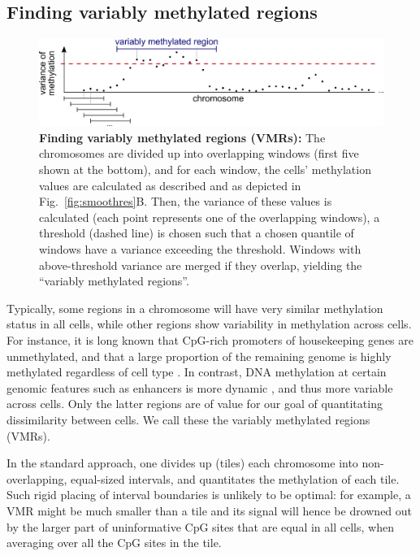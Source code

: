 \documentclass[twocolumn,10pt]{article}
\begin{document}
\subsection{Finding variably methylated regions}

\begin{figure}
    \includegraphics[width=\columnwidth]{figures/Fig_sliding.png}
    \caption{\small \textbf{Finding variably methylated regions (VMRs):} The chromosomes are divided up into overlapping windows (first five shown at the bottom), and for each window, the cells' methylation values are calculated as described and as depicted in Fig.~\ref{fig:smoothres}B.
Then, the variance of these values is calculated (each point represents one of the overlapping windows), a threshold (dashed line) is chosen such that a chosen quantile of windows have a variance exceeding the threshold.
Windows with above-threshold variance are merged if they overlap, yielding the ``variably methylated regions''.}
    \label{fig:vmr}
\end{figure}


Typically, some regions in a chromosome will have very similar methylation status in all cells, while other regions show variability in methylation across cells.
For instance, it is long known that CpG-rich promoters of housekeeping genes are unmethylated, and that a large proportion of the remaining genome is highly methylated regardless of cell type \citep{bird1986cpg}.
In contrast, DNA methylation at certain genomic features such as enhancers is more dynamic \citep{argelaguet2019gastru}, and thus more variable across cells.
Only the latter regions are of value for our goal of quantitating dissimilarity between cells.
We call these the variably methylated regions (VMRs). %

In the standard approach, one divides up (tiles) each chromosome into non-overlapping, equal-sized intervals, and quantitates the methylation of each tile.
Such rigid placing of interval boundaries is unlikely to be optimal: for example, a VMR might be much smaller than a tile and its signal will hence be drowned out by the larger part of uninformative CpG sites that are equal in all cells, when averaging over all the CpG sites in the tile.
\end{document}
